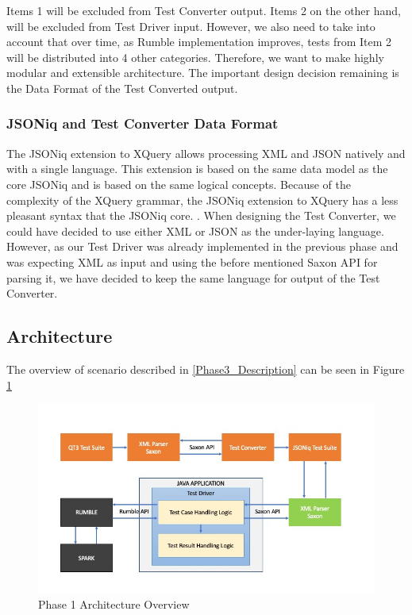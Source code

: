 Items 1 will be excluded from Test Converter output. Items 2 on the other hand, will be excluded from Test Driver input. However, we also need to take into account that over time, as Rumble implementation improves, tests from Item 2 will be distributed into 4 other categories. Therefore, we want to make highly modular and extensible architecture. The important design decision remaining is the Data Format of the Test Converted output.

\subsubsection{JSONiq and Test Converter Data Format}
The JSONiq extension to XQuery allows processing XML and JSON natively and with a single language. This extension is based on the same data model as the core JSONiq and is based on the same logical concepts. Because of the complexity of the XQuery grammar, the JSONiq extension to XQuery has a less pleasant syntax that the JSONiq core. . When designing the Test Converter, we could have decided to use either XML or JSON as the under-laying language. However, as our Test Driver was already implemented in the previous phase and was expecting XML as input and using the before mentioned Saxon API for parsing it, we have decided to keep the same language for output of the Test Converter. 

\subsection{Architecture}
The overview of scenario described in \ref{Phase3_Description} can be seen in Figure \ref{fig:Phase3_Architecture}
\begin{figure}[h!]
	\vspace*{-5mm}
	\includegraphics[width=\linewidth]{architecture_diagram_phase_3.jpg}
	\vspace*{-15mm}
	\caption{Phase 1 Architecture Overview}
	\label{fig:Phase3_Architecture}
\end{figure}

